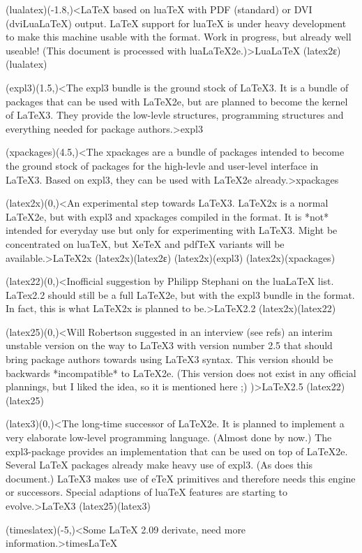 {	\tonode[\vip](lualatex)(-1.8,\layer)<LaTeX based on luaTeX with PDF (standard) or DVI (dviLuaLaTeX) output. LaTeX support for luaTeX is under heavy development to make this machine usable with the format. Work in progress, but already well useable! (This document is processed with luaLaTeX2e.)>{Lua\LaTeX}
	\todraw*(latex2ε)(lualatex)
	\steplayer[-1.5]

	\tonode[\package](expl3)(1.5,\layer)<The expl3 bundle is the ground stock of LaTeX3. It is a bundle of packages that can be used with LaTeX2e, but are planned to become the kernel of LaTeX3. They provide the low-levle structures, programming structures and everything needed for package authors.>{expl3}

	\tonode[\package](xpackages)(4.5,\layer)<The xpackages are a bundle of packages intended to become the ground stock of packages for the high-levle and user-level interface in LaTeX3. Based on expl3, they can be used with LaTeX2e already.>{xpackages}
	\steplayer[-1.5]

	\tonode[\planned](latex2x)(0,\layer)<An experimental step towards LaTeX3. LaTeX2x is a normal LaTeX2e, but with expl3 and xpackages compiled in the format. It is *not* intended for everyday use but only for experimenting with LaTeX3. Might be concentrated on luaTeX, but XeTeX and pdfTeX variants will be available.>{\LaTeX2x}
	\todraw(latex2x)(latex2ε)
	\todraw(latex2x)(expl3)
	\todraw(latex2x)(xpackages)
	\steplayer[-2]

	\tonode[\planned](latex22)(0,\layer)<Inofficial suggestion by Philipp Stephani on the luaLaTeX list. LaTex2.2 should still be a full LaTeX2e, but with the expl3 bundle in the format. In fact, this is what LaTeX2x is planned to be.>{\LaTeX2.2}
	\todraw(latex2x)(latex22)
	\steplayer[-2]

	\tonode[\planned](latex25)(0,\layer)<Will Robertson suggested in an interview (see refs) an interim unstable version on the way to LaTeX3 with version number 2.5 that should bring package authors towards using LaTeX3 syntax. This version should be backwards *incompatible* to LaTeX2e. (This version does not exist in any official plannings, but I liked the idea, so it is mentioned here ;) )>{\LaTeX2.5}
	\todraw(latex22)(latex25)
	
	\steplayer[-3]
	\tonode[\planned](latex3)(0,\layer)<The long-time successor of LaTeX2e. It is planned to implement a very elaborate low-level programming language. (Almost done by now.) The expl3-package provides an implementation that can be used on top of LaTeX2e. Several LaTeX packages already make heavy use of expl3. (As does this document.) LaTeX3 makes use of eTeX primitives and therefore needs this engine or successors. Special adaptions of luaTeX features are starting to evolve.>{\LaTeX{}3}
	\todraw(latex25)(latex3)

	\steplayer[-3]
	\tonode[\experimental](timeslatex)(-5,\layer)<Some LaTeX 2.09 derivate, need more information.>{times\LaTeX}
}

